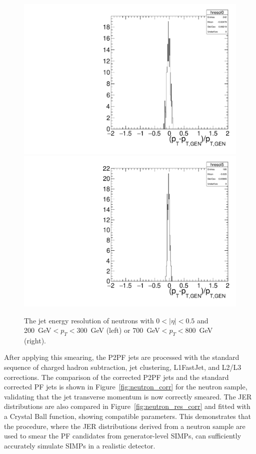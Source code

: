 \begin{figure}[ht]
  \centering
 \includegraphics[width=.48\textwidth]{pt_res_ptbin_0.pdf} \hfill
\includegraphics[width=.48\textwidth]{pt_res_ptbin_5.pdf}
 \caption{The jet energy resolution of neutrons with $0< |\eta| < 0.5$ and \SI{200}{GeV}$<p_T<$\SI{300}{GeV} (left) or \SI{700}{GeV}$<p_T<$\SI{800}{GeV} (right).}
 \label{fig:neutron_res}
\end{figure}

After applying this smearing, the P2PF jets are processed with the standard sequence of charged hadron subtraction, jet clustering, L1FastJet, and L2/L3 corrections. The comparison of the corrected P2PF jets and the standard corrected \ac{PF} jets is shown in Figure~\ref{fig:neutron_corr} for the neutron sample, validating that the jet transverse momentum is now correctly smeared. The \ac{JER} distributions are also compared in Figure~\ref{fig:neutron_res_corr} and fitted with a Crystal Ball function, showing compatible parameters. This demonstrates that the procedure, where the \ac{JER} distributions derived from a neutron sample are used to smear the \ac{PF} candidates from generator-level \acp{SIMP}, can sufficiently accurately simulate \acp{SIMP} in a realistic detector.

